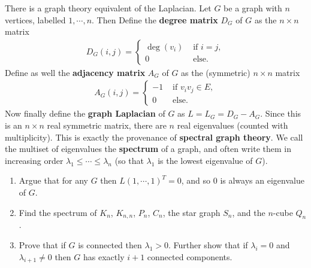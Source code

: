 \documentclass{article}
\theoremstyle{remark}
\begin{document}
\begin{enumerate}
    There is a graph theory equivalent of the Laplacian. Let $G$ be a graph with $n$ vertices, labelled $1 , \cdots , n$. Then Define the \textbf{degree matrix} $D_G$ of $G$ as the $n \times n$ matrix
    \begin{align*}
        D_G(i,j) = \begin{cases}
            \deg (v_i) & \text{ if } i=j,\\
            0 & \text{ else}.
        \end{cases}
    \end{align*}
    Define as well the \textbf{adjacency matrix} $A_G$ of $G$ as the (symmetric) $n \times n$ matrix
    \begin{align*}
        A_G(i,j) = \begin{cases}
            -1 & \text{ if } v_i v_j \in E,\\
            0 & \text{ else}.
        \end{cases}
    \end{align*}
    Now finally define the \textbf{graph Laplacian} of $G$ as $L = L_G = D_G - A_G$. Since this is an $n \times n$ real symmetric matrix, there are $n$ real eigenvalues (counted with multiplicity). This is exactly the provenance of \textbf{spectral graph theory}. We call the multiset of eigenvalues the \textbf{spectrum} of a graph, and often write them in increasing order $\lambda_1 \leq \cdots \leq \lambda_n$ (so that $\lambda_1$ is the lowest eigenvalue of $G$).
    \begin{enumerate}
        \item Argue that for any $G$ then $L (1, \cdots, 1)^T = 0$, and so $0$ is always an eigenvalue of $G$.
        \item Find the spectrum of $K_n$, $K_{n,n}$, $P_n$, $C_n$, the star graph $S_n$, and the $n$-cube $Q_n$.
        \item Prove that if $G$ is connected then $\lambda_1> 0$.  Further show that if $\lambda_i = 0$ and $\lambda_{i+1} \neq 0$ then $G$ has exactly $i+1$ connected components.
    \end{enumerate}
\end{enumerate}
\end{document}
